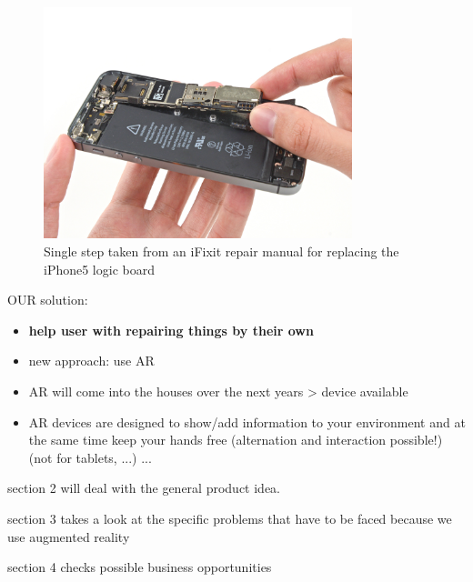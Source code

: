 \begin{itemize}
\begin{itemize}
\begin{figure}[H]
				\includegraphics[width=0.8\textwidth]{../images/ifixit-iphone-logicboard.jpg}
				\centering
				\caption[Single step taken from an iFixit repair manual for replacing the iPhone5 logic board]{Single step taken from an iFixit repair manual for replacing the iPhone5 logic board\footnotemark}
			\end{figure}
		\end{itemize}
	\end{itemize}
	
	OUR solution:
	\begin{itemize}
		\itemsep0em
		\item \textbf{help user with repairing things by their own}
		\item new approach: use AR
		\item AR will come into the houses over the next years > device available
		\item AR devices are designed to show/add information to your environment and at the same time keep your hands free (alternation and interaction possible!) (not for tablets, ...) ...
	\end{itemize}
	
	
	section 2 will deal with the general product idea.
	
	section 3 takes a look at the specific problems that have to be faced because we use augmented reality
	
	section 4 checks possible business opportunities

